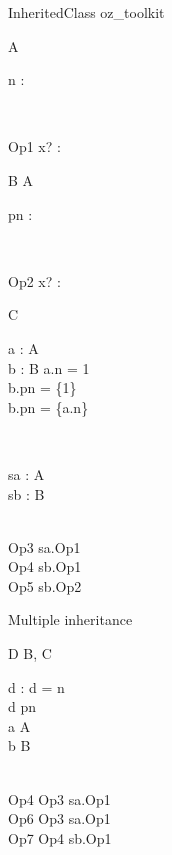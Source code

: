 \begin{zsection}
  \SECTION InheritedClass \parents oz\_toolkit
\end{zsection}

\begin{class}{A}
  \begin{state}
    n : \nat
  \end{state}\\
  \begin{op}{Op1}
    x? : \nat
  \end{op}
\end{class}

\begin{class}{B}
  A\\
  \begin{state}
    pn : \power \nat
  \end{state}\\
  \begin{op}{Op2}
    x? : \power \nat
  \end{op}
\end{class}

\begin{class}{C}
  \begin{axdef}
    a : \poly A\\
    b : B
  \where
    a.n = 1\\
    b.pn = \{1\}\\
    b.pn = \{a.n\}
  \end{axdef}\\
  \begin{state}
    sa : \poly A\\
    sb : B
  \end{state}\\
  Op3 \sdef sa.Op1\\
  Op4 \sdef sb.Op1\\
  Op5 \sdef sb.Op2
\end{class}

Multiple inheritance
\begin{class}{D}
  B, C\\
  \begin{state}
    d : \nat
  \where
    d = n\\
    d \in pn\\
    a \in \poly A\\
    b \in B
  \end{state}\\
  Op4 \sdef Op3 \land sa.Op1\\
  Op6 \sdef Op3 \land sa.Op1\\
  Op7 \sdef Op4 \land sb.Op1
\end{class}
